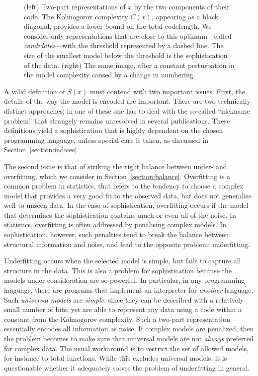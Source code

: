 \begin{figure}[tb]
\begin{minipage}{0.40\textwidth}
  \end{minipage}
  \caption{\small (left) Two-part representations of $x$ by the two components of their code. The Kolmogorov complexity $C(x)$, appearing as a black diagonal, provides a lower bound on the total codelength. We consider only representations that are close to this optimum---called \emph{candidates}---with the threshold represented by a dashed line. The size of the smallest model below the threshold is the sophistication of the data. (right) The same image, after a constant perturbation in the model complexity caused by a change in numbering.}
  \label{figure:diagram}
\end{figure}\enlargethispage{3\baselineskip}

A valid definition of $S(x)$ must contend with two important issues. First, the details of the way the model is encoded are important. There are two technically distinct approaches; in one of these one has to deal with the so-called ``nickname problem'' that strangely remains unresolved in several publications. These definitions yield a sophistication that is highly dependent on the chosen programming language, unless special care is taken, as discussed in Section~\ref{section:indices}.

The second issue is that of striking the right balance between under- and overfitting, which we consider in Section~\ref{section:balance}. Overfitting is a common problem in statistics, that refers to the tendency to choose a complex model that provides a very good fit to the observed data, but does not generalise well to unseen data. In the case of sophistication, overfitting occurs if the model that determines the sophistication contains much or even all of the noise. In statistics, overfitting is often addressed by penalising complex models. In sophistication, however, such penalties tend to break the balance between structural information and noise, and lead to the opposite problem: underfitting.


Underfitting occurs when the selected model is simple, but fails to capture all structure in the data. This is also a problem for sophistication because the models under consideration are so powerful. In particular, in any programming language, there are programs that implement an interpreter for \emph{another} language. Such \emph{universal models} are \emph{simple}, since they can be described with a relatively small number of bits, yet are able to represent any data using a code within a constant from the Kolmogorov complexity. Such a two-part representation essentially encodes all information as noise. If complex models are penalized, then the problem becomes to make sure that universal models are not \emph{always} preferred for complex data. The usual workaround is to restrict the set of allowed models, for instance to total functions. While this excludes universal models, it is questionable whether it adequately solves the problem of underfitting in general.

